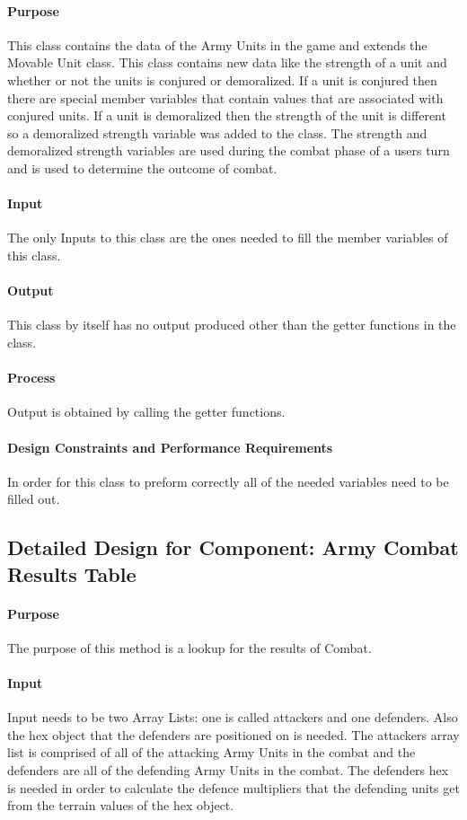 \documentclass[12pt,a4paper,titlepage]{article}
\begin{document}
\paragraph{Purpose} This class contains the data of the Army Units in the game and extends the Movable Unit class. This class contains new data like the strength of a unit and whether or not the units is conjured or demoralized. If a unit is conjured then there are special member variables that contain values that are associated with conjured units. If a unit is demoralized then the strength of the unit is different so a demoralized strength variable was added to the class. The strength and demoralized strength variables are used during the combat phase of a users turn and is used to determine the outcome of combat. 
\paragraph{Input} The only Inputs to this class are the ones needed to fill the member variables of this class.
\paragraph{Output} This class by itself has no output produced other than the getter functions in the class.
\paragraph{Process} Output is obtained by calling the getter functions. 
\paragraph{Design Constraints and Performance Requirements}	In order for this class to preform correctly all of the needed variables need to be filled out.

\subsection{Detailed Design for Component: Army Combat Results Table}
\paragraph{Purpose} The purpose of this method is a lookup for the results of Combat. 
\paragraph{Input} Input needs to be two Array Lists: one is called attackers and one defenders. Also the hex object that the defenders are positioned on is needed. The attackers array list is comprised of all of the attacking Army Units in the combat and the defenders are all of the defending Army Units in the combat. The defenders hex is needed in order to calculate the defence multipliers that the defending units get from the terrain values of the hex object.
\end{document}
